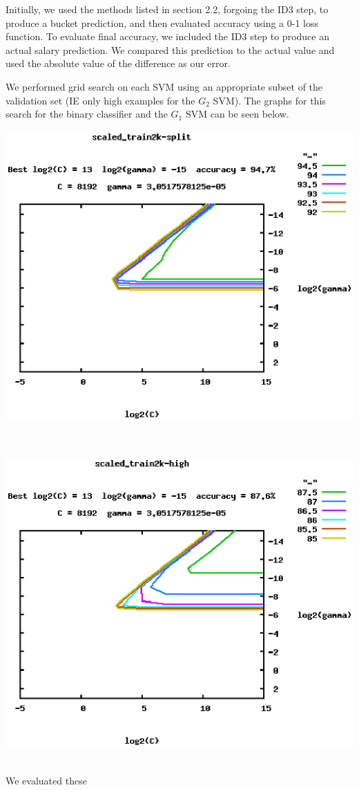\documentclass{pset}
\begin{document}
Initially, we used the methods listed in section 2.2, forgoing the ID3 step, to
produce a bucket prediction, and then evaluated accuracy using a 0-1 loss
function. To evaluate final accuracy, we included the ID3 step to produce an
actual salary prediction. We compared this prediction to the actual value and
used the absolute value of the difference as our error.

We performed grid search on each SVM using an appropriate subset of the
validation set (IE only high examples for the $G_2$ SVM). The graphs for this
search for the binary classifier and the $G_1$ SVM can be seen below.\\
\centerline{\includegraphics[scale=0.6]{binaryGridSearch}}\\
\centerline{\includegraphics[scale=0.6]{highGridSearch}}\\ We evaluated these
\end{document}
